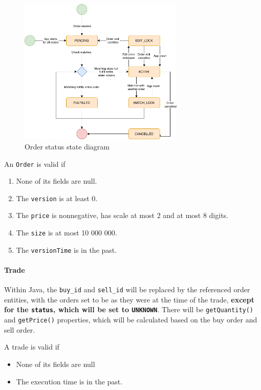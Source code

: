 \documentclass{article}
\begin{document}
\begin{figure}[h]
    \centering
    \includegraphics[width=0.7\textwidth]{order-state.png}
    \caption{Order status state diagram}
    \label{fig:order-state-diagram}
\end{figure}

An \texttt{Order} is valid if
\begin{enumerate}
    \item None of its fields are null.
    \item The \texttt{version} is at least 0.
    \item The \texttt{price} is nonnegative, has scale at most 2 and at most 8 digits.
    \item The \texttt{size} is at most 10 000 000.
    \item The \texttt{versionTime} is in the past.
\end{enumerate}


\paragraph{Trade} Within Java, the \texttt{buy\_id} and \texttt{sell\_id} will be replaced by the referenced order entities, with the orders set to be as they were at the time of the trade, \textbf{except for  the \texttt{status}, which will be set to \texttt{UNKNOWN}}. There will be \texttt{getQuantity()} and \texttt{getPrice()} properties, which will be calculated based on the buy order and sell order.

A trade is valid if 
\begin{itemize}
    \item None of its fields are null
    \item The execution time is in the past.
\end{itemize}
\end{document}
